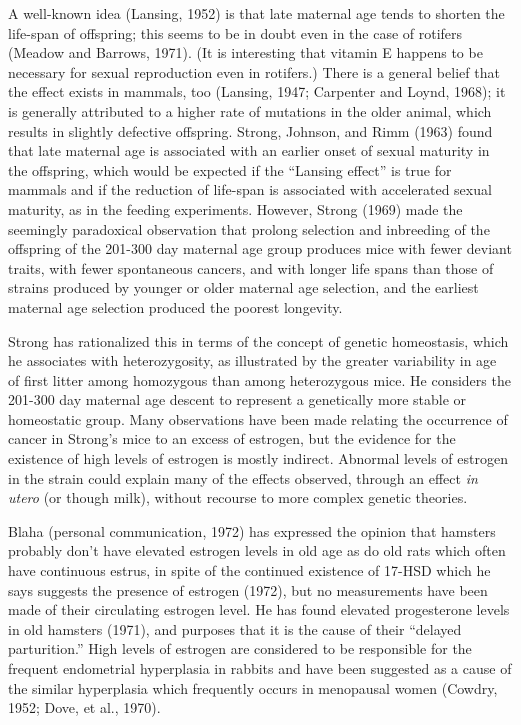 A well-known idea (Lansing, 1952) is that late maternal age tends to shorten the life-span of offspring; this seems to be in doubt even in the case of rotifers (Meadow and Barrows, 1971). (It is interesting that vitamin E happens to be necessary for sexual reproduction even in rotifers.) There is a general
belief that the effect exists in mammals, too (Lansing, 1947; Carpenter and Loynd, 1968); it is generally attributed to a higher rate of mutations in the older animal, which results in slightly defective offspring. Strong, Johnson, and Rimm (1963) found that
late maternal age is associated with an earlier onset of sexual maturity in the offspring, which would be expected if the ``Lansing effect'' is true for mammals and if the reduction of life-span is associated with accelerated
sexual maturity, as in the feeding experiments. However, Strong (1969) made the seemingly paradoxical observation that prolong selection and inbreeding of the offspring of the 201-300 day maternal age group produces mice with
fewer deviant traits, with fewer spontaneous cancers, and with longer life spans than those of strains produced by younger or older maternal age selection, and the earliest maternal age selection produced the poorest longevity.

Strong has rationalized this in terms of the concept of genetic homeostasis, which he associates with heterozygosity, as illustrated by the greater variability in age of first litter among
homozygous than among heterozygous mice. He considers the 201-300 day maternal age descent to represent a genetically more stable or homeostatic group. Many observations have been made relating the
occurrence of cancer in Strong's mice to an excess of estrogen, but the evidence for the existence of high levels of estrogen is mostly indirect. Abnormal levels of estrogen in the strain could explain many of the effects
observed, through an effect \textit{in utero} (or though milk), without recourse to more complex genetic theories.

Blaha (personal communication, 1972) has expressed the opinion that hamsters probably don't have elevated estrogen levels in old age as do old rats which often have continuous estrus, in spite of the continued existence of 17-HSD which he says suggests the presence of estrogen (1972), but no measurements
have been made of their circulating estrogen level. He has found elevated progesterone levels in old hamsters (1971), and purposes that it is the cause of their ``delayed parturition.'' High levels of estrogen are considered to be responsible for the frequent endometrial hyperplasia in rabbits and have been suggested
as a cause of the similar hyperplasia which frequently occurs in menopausal women (Cowdry, 1952; Dove, et al., 1970).

